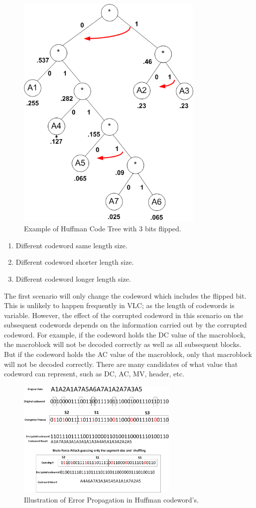 \documentclass[preprint]{elsarticle}
\begin{document}
\begin{figure}[!ht]
\centering
\includegraphics[width=9cm]{figure5.png}
\caption{Example of Huffman Code Tree with 3 bits flipped.}
\label{f5}
\end{figure} 

\begin{enumerate}
\item Different codeword same length size.
\item Different codeword shorter length size.
\item Different codeword longer length size.
\end{enumerate}

The first scenario will only change the codeword which includes the flipped bit. This is unlikely to happen frequently in VLC; as the length of codewords is variable. However, the effect of the corrupted codeword in this scenario on the subsequent codewords depends on the information carried out by the corrupted codeword. For example, if the codeword holds the DC value of the macroblock, the macroblock will not be decoded correctly as well as all subsequent blocks. But if the codeword holds the AC value of the macroblock, only that macroblock will not be decoded correctly. There are many candidates of what value that codeword can represent, such as DC, AC, MV, header, etc. 

\begin{figure}[!ht]
\centering
\includegraphics[width=7.7cm]{figure6.png}
\caption{Illustration of Error Propagation in Huffman codeword's.}
\label{f6}
\end{figure} 
\end{document}
